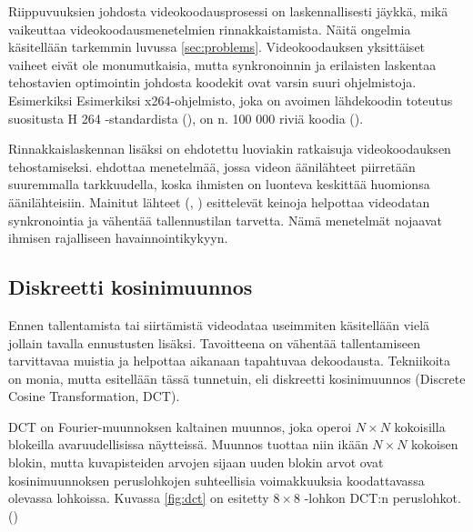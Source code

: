Riippuvuuksien johdosta videokoodausprosessi on laskennallisesti jäykkä, mikä
vaikeuttaa videokoodausmenetelmien rinnakkaistamista. Näitä ongelmia
käsitellään tarkemmin luvussa \ref{sec:problems}. Videokoodauksen yksittäiset
vaiheet eivät ole monumutkaisia, mutta synkronoinnin ja erilaisten laskentaa
tehostavien optimointin johdosta koodekit ovat varsin suuri ohjelmistoja. Esimerkiksi
Esimerkiksi x264-ohjelmisto, joka on avoimen lähdekoodin toteutus
suositusta H 264 -standardista (\citealt{h264}), on n. 100 000 riviä koodia (\citealt{x264}).

Rinnakkaislaskennan lisäksi on ehdotettu luoviakin ratkaisuja videokoodauksen
tehostamiseksi. \citealt{lee} ehdottaa menetelmää, jossa videon
äänilähteet piirretään suuremmalla tarkkuudella, koska ihmisten on luonteva
keskittää huomionsa äänilähteisiin. Mainitut lähteet (\citealt{mujal},
\citealt{sync}) esittelevät keinoja helpottaa videodatan synkronointia ja vähentää
tallennustilan tarvetta. Nämä menetelmät nojaavat ihmisen rajalliseen
havainnointikykyyn.

\subsection{Diskreetti kosinimuunnos}

Ennen tallentamista tai siirtämistä videodataa useimmiten käsitellään vielä
jollain tavalla ennustusten lisäksi. Tavoitteena on vähentää tallentamiseen
tarvittavaa muistia ja helpottaa aikanaan tapahtuvaa dekoodausta. Tekniikoita
on monia, mutta esitellään tässä tunnetuin, eli diskreetti kosinimuunnos
(Discrete Cosine Transformation, DCT). 

DCT on Fourier-muunnoksen kaltainen muunnos, joka operoi $N \times N$
kokoisilla blokeilla avaruudellisissa näytteissä. Muunnos tuottaa niin
ikään $N \times N$ kokoisen blokin, mutta kuvapisteiden arvojen sijaan
uuden blokin arvot ovat kosinimuunnoksen peruslohkojen suhteellisia
voimakkuuksia koodattavassa olevassa lohkoissa. Kuvassa \ref{fig:dct} on esitetty
$8  \times 8$ -lohkon DCT:n peruslohkot. (\citealt{h264})

